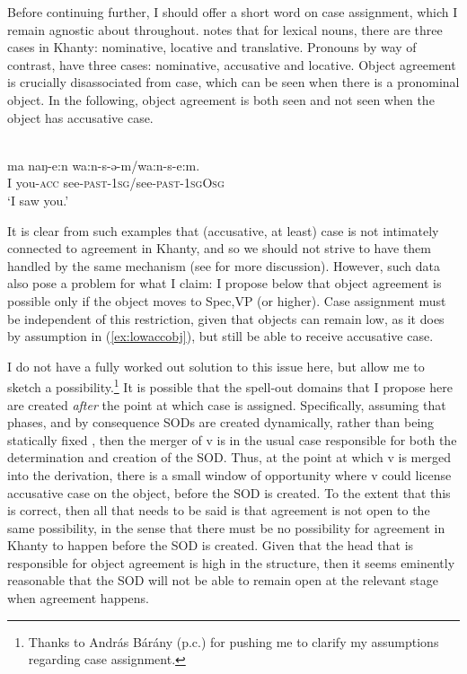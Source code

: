 \documentclass[output=paper
,modfonts
,nonflat]{langsci/langscibook}
\begin{document}
\noindent Before continuing further, I should offer a short word on case assignment, which I remain agnostic about throughout.
\citet{ostyakgrammar} notes that for lexical nouns, there are three cases in Khanty: nominative, locative and translative.
Pronouns by way of contrast, have three cases: nominative, accusative and locative.
Object agreement is crucially disassociated from case, which can be seen when there is a pronominal object.
In the following, object agreement is both seen and not seen when the object has accusative case.

\begin{exe}
  \ex \citet[][65]{ostyakgrammar}\\
    \gll ma naŋ-e:n wa:n-s-ə-m/wa:n-s-e:m.\\
    I you-\textsc{acc} see-\textsc{past-1sg}/see-\textsc{past-1sgOsg}\\
    \glt `I saw you.' \hfill  \label{ex:lowaccobj}
\end{exe}

\noindent It is clear from such examples that (accusative, at least) case is not intimately connected to agreement in Khanty, and so we should not strive to have them handled by the same mechanism (see \citealt[][ch 5]{baker2008} for more discussion).
However, such data also pose a problem for what I claim: I propose below that object agreement is possible only if the object moves to Spec,VP (or higher).
Case assignment must be independent of this restriction, given that objects can remain low, as it does by assumption in (\ref{ex:lowaccobj}), but still be able to receive accusative case.

I do not have a fully worked out solution to this issue here, but allow me to sketch a possibility.\footnote{Thanks to András Bárány (p.c.) for pushing me to clarify my assumptions regarding case assignment.}
It is possible that the spell-out domains that I propose here are created \emph{after} the point at which case is assigned.
Specifically, assuming that phases, and by consequence SODs are created dynamically, rather than being statically fixed \citep[see for instance][]{bobaljikwurmbrand2005,bobaljikwurmbrand2013,boskovic2014}, then the merger of v is in the usual case responsible for both the determination and creation of the SOD.
Thus, at the point at which v is merged into the derivation, there is a small window of opportunity where v could license accusative case on the object, before the SOD is created.
To the extent that this is correct, then all that needs to be said is that agreement is not open to the same possibility, in the sense that there must be no possibility for agreement in Khanty to happen before the SOD is created.
Given that the head that is responsible for object agreement is high in the structure, then it seems eminently reasonable that the SOD will not be able to remain open at the relevant stage when agreement happens.
\end{document}
